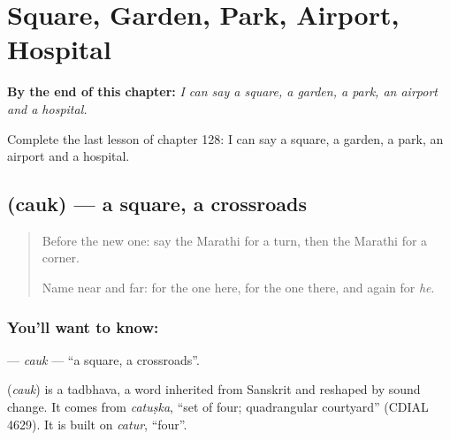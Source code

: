 
\chapter{Square, Garden, Park, Airport, Hospital}
\label{ch:mr-square-garden-park-airport-hospital}

\begin{chapteropening}
\textbf{By the end of this chapter:} \emph{I can say a square, a garden, a park, an airport and a hospital.}

Complete the last lesson of chapter 128: I can say a square, a garden, a park, an airport and a hospital.
\end{chapteropening}

\section[\texorpdfstring{\mr{चौक} (cauk)}{चौक (cauk)}]{ (cauk) — a square, a crossroads}

\label{lesson:MR-C128-cauk}



\begin{quote}
Before the new one: say the Marathi for a turn, then the Marathi for a corner.

Name near and far: \textbf{} for the one here, \textbf{} for the one there, and \textbf{} again for \emph{he}.
\end{quote}

\subsection*{You'll want to know: }
\textbf{} — \emph{cauk} — \textquotedblleft{}a square, a crossroads\textquotedblright{}.

\begin{cousinweb}
\textbf{} (\emph{cauk}) is a tadbhava, a word inherited from Sanskrit and reshaped by sound change. It comes from \emph{catuṣka}, \textquotedblleft{}set of four; quadrangular courtyard\textquotedblright{} (CDIAL 4629). It is built on \emph{catur}, \textquotedblleft{}four\textquotedblright{}.
\end{cousinweb}

